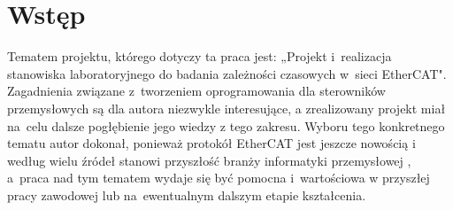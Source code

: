 \section{Wstęp}
Tematem projektu, którego dotyczy ta praca jest: „Projekt i~realizacja stanowiska laboratoryjnego do badania zależności czasowych w~sieci EtherCAT". Zagadnienia związane z~tworzeniem oprogramowania dla sterowników przemysłowych są dla autora niezwykle interesujące, a zrealizowany projekt miał na~celu dalsze pogłębienie jego wiedzy z tego zakresu. Wyboru tego konkretnego tematu autor dokonał, ponieważ protokół EtherCAT jest jeszcze nowością i według wielu źródeł stanowi przyszłość branży informatyki przemysłowej \cite{art1_etherCAT, art2_etherCAT}, a~praca nad tym tematem wydaje się być pomocna i~wartościowa w przyszłej pracy zawodowej lub na~ewentualnym dalszym etapie kształcenia.

